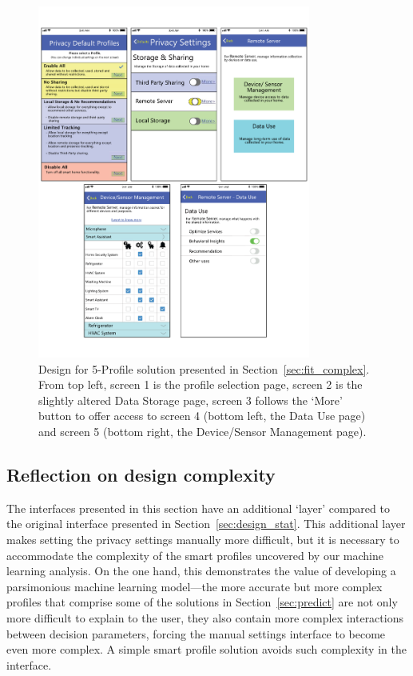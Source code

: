 \begin{figure}
	\centering
	\includegraphics[width=0.8\textwidth]{figures/cluster_complex.pdf}
	\caption{Design for 5-Profile solution presented in Section~\ref{sec:fit_complex}. From top left, screen 1 is the profile selection page, screen 2 is the slightly altered Data Storage page, screen 3 follows the `More' button to offer access to screen 4 (bottom left, the Data Use page) and screen 5 (bottom right, the Device/Sensor Management page).}
	\label{fig:cluster_complex}
\end{figure}

\subsection{Reflection on design complexity}
The interfaces presented in this section have an additional `layer' compared to the original interface presented in Section~\ref{sec:design_stat}. This additional layer makes setting the privacy settings manually more difficult, but it is necessary to accommodate the complexity of the smart profiles uncovered by our machine learning analysis. On the one hand, this demonstrates the value of developing a parsimonious machine learning model---the more accurate but more complex profiles that comprise some of the solutions in Section~\ref{sec:predict} are not only more difficult to explain to the user, they also contain more complex interactions between decision parameters, forcing the manual settings interface to become even more complex. A simple smart profile solution avoids such complexity in the interface. 

